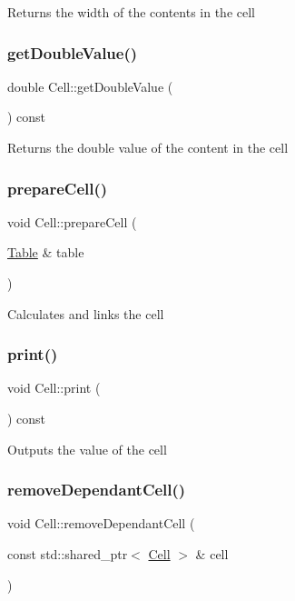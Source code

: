 Returns the width of the contents in the cell \mbox{\label{classCell_a8c28bb1ce92cce3c2440ef1484316e65}} 
\subsubsection{\texorpdfstring{get\+Double\+Value()}{getDoubleValue()}}
{\footnotesize\ttfamily double Cell\+::get\+Double\+Value (\begin{DoxyParamCaption}{ }\end{DoxyParamCaption}) const}

Returns the double value of the content in the cell \mbox{\label{classCell_a4fb8248ff66f84e93d72b4c57a8e0e5a}} 
\subsubsection{\texorpdfstring{prepare\+Cell()}{prepareCell()}}
{\footnotesize\ttfamily void Cell\+::prepare\+Cell (\begin{DoxyParamCaption}\item[{\hyperlink{classTable}{Table} \&}]{table }\end{DoxyParamCaption})}

Calculates and links the cell \mbox{\label{classCell_a0265c2967d02fd1b211728f520f73d42}} 
\subsubsection{\texorpdfstring{print()}{print()}}
{\footnotesize\ttfamily void Cell\+::print (\begin{DoxyParamCaption}{ }\end{DoxyParamCaption}) const}

Outputs the value of the cell \mbox{\label{classCell_a7515c31e889acf8147b739a390b04f56}} 
\subsubsection{\texorpdfstring{remove\+Dependant\+Cell()}{removeDependantCell()}}
{\footnotesize\ttfamily void Cell\+::remove\+Dependant\+Cell (\begin{DoxyParamCaption}\item[{const std\+::shared\+\_\+ptr$<$ \hyperlink{classCell}{Cell} $>$ \&}]{cell }\end{DoxyParamCaption})}

